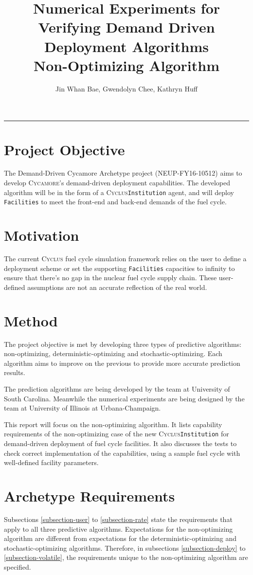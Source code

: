 \documentclass[11pt,letterpaper]{article}
\title{Numerical Experiments for Verifying Demand Driven Deployment Algorithms 
        \\ \vspace{0.5em} Non-Optimizing Algorithm}
\author{Jin Whan Bae, Gwendolyn Chee, Kathryn Huff}
\newcommand{\Cyclus}{\textsc{Cyclus}\xspace}%
\newcommand{\Cycamore}{\textsc{Cycamore}\xspace}%
\begin{document}
	\maketitle
	\hrule

\section{Project Objective}
The Demand-Driven Cycamore Archetype project (NEUP-FY16-10512) aims to develop \Cycamore's demand-driven deployment capabilities. The developed algorithm will be in the form of a \Cyclus \texttt{Institution} agent, and will deploy \texttt{Facilities} to meet the front-end and back-end demands of the fuel cycle.

\section{Motivation} 
The current \Cyclus fuel cycle simulation framework relies on the user to define
a deployment scheme or set the supporting \texttt{Facilities} capacities to infinity
to ensure that there's no gap in the nuclear fuel cycle supply chain. These user-defined assumptions 
are not an accurate reflection of the real world. 

\section{Method}
The project objective is met by developing three types of predictive algorithms: non-optimizing, deterministic-optimizing and stochastic-optimizing. Each algorithm aims to improve on the previous 
to provide more accurate prediction results.  

The prediction algorithms are being developed by the team at University of South Carolina. Meanwhile the numerical experiments are being designed by the team at University of Illinois at Urbana-Champaign.

This report will focus on the non-optimizing algorithm. 
It lists capability requirements of the non-optimizing case of the new \Cyclus \texttt{Institution}
for demand-driven deployment of fuel cycle facilities. 
It also discusses the tests to check correct implementation of the capabilities,
using a sample fuel cycle with well-defined facility parameters.

\section{Archetype Requirements}
Subsections \ref{subsection-user} to \ref{subsection-rate} state the requirements that apply to all three predictive algorithms. Expectations for the non-optimizing algorithm are different from expectations for the deterministic-optimizing and stochastic-optimizing algorithms. Therefore, in subsections \ref{subsection-deploy} to \ref{subsection-volatile}, the requirements unique to the non-optimizing algorithm are specified. 
\end{document}
